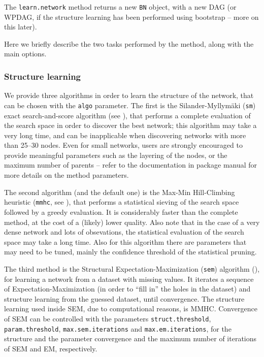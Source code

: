 \documentclass{article}\usepackage[]{graphicx}\usepackage[]{color}
\newcommand{\Robject}[1]{{\texttt{#1}}}
\newcommand{\Rmethod}[1]{{\texttt{#1}}}
\newcommand{\Rfunarg}[1]{{\texttt{#1}}}
\begin{document}
The \Rmethod{learn.network} method returns a new \Robject{BN} object, with a new DAG (or WPDAG, if the structure
learning has been performed using bootstrap -- more on this later).

Here we briefly describe the two tasks performed by the method, along with the main options.

\subsubsection{Structure learning}
We provide three algorithms in order to learn the structure of the network, that can be chosen with the \texttt{algo} parameter.
The first is the Silander-Myllym\"aki (\texttt{sm})
exact search-and-score algorithm (see \citet*{silander2012simple}), that performs a complete evaluation of the search space in order to discover
the best network; this algorithm may take a very long time, and can be inapplicable when discovering networks
with more than 25--30 nodes. Even for small networks, users are strongly encouraged to provide
meaningful parameters such as the layering of the nodes, or the maximum number of parents -- refer to the 
documentation in package manual for more details on the method parameters.

The second algorithm (and the default one) is the Max-Min Hill-Climbing heuristic (\texttt{mmhc}, see \citet*{tsamardinos2006max}), that performs a statistical
sieving of the search space followed by a greedy evaluation. It is considerably faster than the complete method, at the cost of a (likely)
lower quality. Also note that in the case of a very dense network and lots of obsevations, the statistical evaluation
of the search space may take a long time. Also for this algorithm there are parameters that may need to be tuned,
mainly the confidence threshold of the statistical pruning.

The third method is the Structural Expectation-Maximization (\texttt{sem}) algorithm (\citet{friedman1997learning,friedman1998bayesian}),
for learning a network from a dataset with missing values. It iterates a sequence of Expectation-Maximization (in order to ``fill in''
the holes in the dataset) and structure learning from the guessed dataset, until convergence. The structure learning used inside SEM,
due to computational reasons, is MMHC. Convergence of SEM can be controlled with the parameters \Rfunarg{struct.threshold},
\Rfunarg{param.threshold}, \Rfunarg{max.sem.iterations} and \Rfunarg{max.em.iterations},
for the structure and the parameter convergence and the maximum number of iterations of SEM and EM, respectively.
\end{document}
